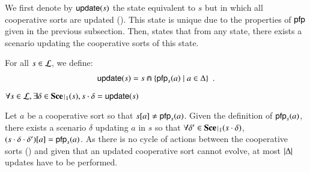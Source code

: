 We first denote by $\mathsf{update}(s)$ the state equivalent to $s$ but in which all cooperative sorts are updated ().
This state is unique due to the properties of $\mathsf{pfp}$ given in the previous subsection.
Then,  states that from any state, there exists a scenario updating the cooperative sorts of this state.
%
\begin{definition}[$\update : \PHl \rightarrow \PHl$]
\label{def:update}
  For all $s \in \mathcal{L}$, we define:
  \begin{align*}
    \mathsf{update}(s) = s \Cap \{ \mathsf{pfp}_{s}(a) \mid a \in \Delta \} \enspace.
  \end{align*}
\end{definition}
%
\begin{theorem}
\label{th:update}
  $\forall s \in \PHl, \exists \delta \in \restriction{\Sce}{1}(s), s \PHplay \delta = \update(s)$
\end{theorem}
%
\begin{proofupdate}
  Let $a$ be a cooperative sort so that ${s[a]} \neq \mathsf{pfp}_s(a)$.
  Given the definition of $\mathsf{pfp}_s(a)$, there exists a scenario $\delta$ updating $a$ in $s$ so that
  $\forall \delta' \in \restriction{\Sce}{1}(s \PHplay \delta)$, ${(s \cdot \delta \cdot \delta')[a]} = \mathsf{pfp}_s(a)$.
  As there is no cycle of actions between the cooperative sorts () and given that an updated cooperative sort cannot evolve, at most $|\Delta|$ updates have to be performed.
\end{proofupdate}

